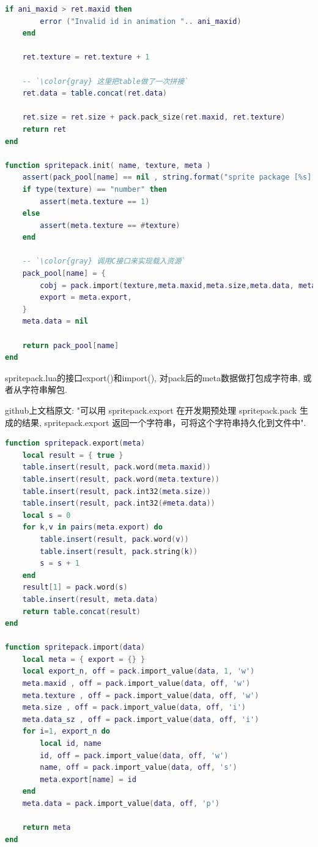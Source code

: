 \begin{lstlisting}[language=lua]
    if ani_maxid > ret.maxid then
        error ("Invalid id in animation ".. ani_maxid)
    end

    ret.texture = ret.texture + 1

    -- `\color{gray} 这里把table做了一次拼接`
    ret.data = table.concat(ret.data)

    ret.size = ret.size + pack.pack_size(ret.maxid, ret.texture)
    return ret
end

function spritepack.init( name, texture, meta )
    assert(pack_pool[name] == nil , string.format("sprite package [%s] is exist", name))
    if type(texture) == "number" then
        assert(meta.texture == 1)
    else
        assert(meta.texture == #texture)
    end
    
    -- `\color{gray} 调用C接口来实现载入资源`
    pack_pool[name] = {
        cobj = pack.import(texture,meta.maxid,meta.size,meta.data, meta.data_sz),
        export = meta.export,
    }
    meta.data = nil

    return pack_pool[name]
end
\end{lstlisting}

{spritepack.lua的接口export()和import(), 对pack后的meta数据做打包成字符串, 或者从字符串解包.}\par
{github上文档原文: "可以用 spritepack.export 在开发期预处理 spritepack.pack 生成的结果, spritepack.export 返回一个字符串，可将这个字符串持久化到文件中". } \par

\begin{lstlisting}[language=lua]
function spritepack.export(meta)
    local result = { true }
    table.insert(result, pack.word(meta.maxid))
    table.insert(result, pack.word(meta.texture))
    table.insert(result, pack.int32(meta.size))
    table.insert(result, pack.int32(#meta.data))
    local s = 0
    for k,v in pairs(meta.export) do
        table.insert(result, pack.word(v))
        table.insert(result, pack.string(k))
        s = s + 1
    end
    result[1] = pack.word(s)
    table.insert(result, meta.data)
    return table.concat(result)
end

function spritepack.import(data)
    local meta = { export = {} }
    local export_n, off = pack.import_value(data, 1, 'w')
    meta.maxid , off = pack.import_value(data, off, 'w')
    meta.texture , off = pack.import_value(data, off, 'w')
    meta.size , off = pack.import_value(data, off, 'i')
    meta.data_sz , off = pack.import_value(data, off, 'i')
    for i=1, export_n do
        local id, name
        id, off = pack.import_value(data, off, 'w')
        name, off = pack.import_value(data, off, 's')
        meta.export[name] = id
    end
    meta.data = pack.import_value(data, off, 'p')

    return meta
end
\end{lstlisting}



